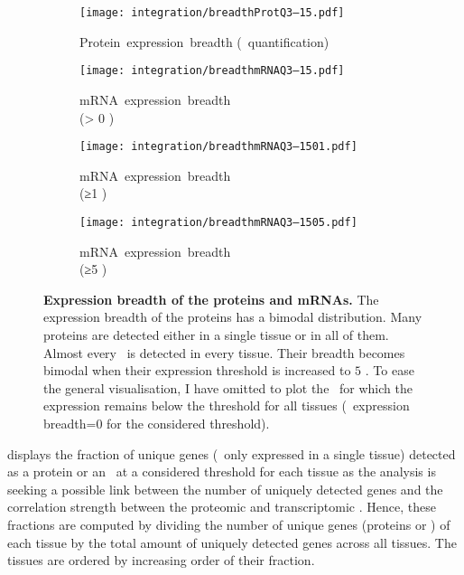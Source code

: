 \begin{figure}[!htb]
    \begin{subfigure}[h]{0.53\textwidth}
    \captionsetup{margin=0.6cm,justification=centering}
        \centering \texttt{[image: integration/breadthProtQ3--15.pdf]}
        \caption{Protein~expression~breadth (\PPKM~quantification)}\label{fig:protBreadth}
    \end{subfigure}
    \begin{subfigure}[h]{0.53\textwidth}
    \captionsetup{margin=0.6cm,justification=centering}
        \centering \texttt{[image: integration/breadthmRNAQ3--15.pdf]}
        \caption{mRNA~expression~breadth\\(> 0 \FPKM)}\label{fig:mRNAbreadth0}
    \end{subfigure}
    \vspace{2.5mm}

    \begin{subfigure}[b]{0.53\textwidth}
    \captionsetup{margin=0.6cm,justification=centering}
        \centering \texttt{[image: integration/breadthmRNAQ3--1501.pdf]}
        \caption{mRNA~expression~breadth\\(≥1 \FPKM)}\label{fig:mRNAbreadth1}
    \end{subfigure}
    \begin{subfigure}[b]{0.53\textwidth}
    \captionsetup{margin=0.6cm,justification=centering}
        \centering \texttt{[image: integration/breadthmRNAQ3--1505.pdf]}
        \caption{mRNA~expression~breadth\\(≥5 \FPKM)}\label{fig:mRNAbreadth5}
    \end{subfigure}
    \vspace{-6mm}
    \caption[Expression breadth of the proteins and mRNAs]{\label{fig:expressionBreadth}%
    \textbf{Expression breadth of the proteins and mRNAs.}
    The expression breadth of the proteins has a bimodal distribution.
    Many proteins are detected either in a single tissue or in all of them.
    Almost every \mRNA\ is detected in every tissue.
    Their breadth becomes bimodal when their expression threshold
    is increased to $5$ \FPKM{}.
    To ease the general visualisation,
    I have omitted to plot the \mRNAs\
    for which the expression remains below the threshold for all tissues
    (\ie\ expression breadth=0 for the considered threshold).
    }
\end{figure}

 displays the fraction of unique genes
(\ie\ only expressed in a single tissue)
detected as a protein or an \mRNA\ at a considered threshold for each tissue as
the analysis is seeking a possible link between
the number of uniquely detected genes
and the correlation strength between the proteomic and transcriptomic \treps{}.
Hence, these fractions are computed by dividing
the number of unique genes (proteins or \mRNAs) of each tissue
by the total amount of uniquely detected genes across all tissues.
The tissues are ordered by increasing order of their fraction.\mybr\

